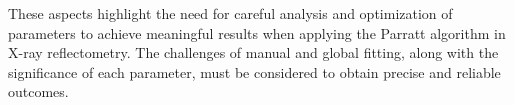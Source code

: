 These aspects highlight the need for careful analysis and optimization of parameters to achieve meaningful results when applying the Parratt algorithm in X-ray reflectometry. The challenges of manual and global fitting, along with the significance of each parameter, must be considered to obtain precise and reliable outcomes.
